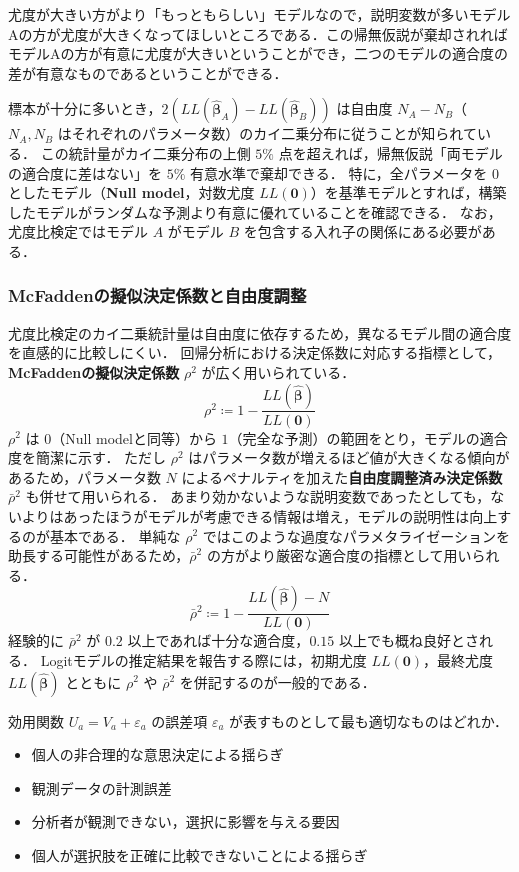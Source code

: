 尤度が大きい方がより「もっともらしい」モデルなので，説明変数が多いモデルAの方が尤度が大きくなってほしいところである．この帰無仮説が棄却されればモデルAの方が有意に尤度が大きいということができ，二つのモデルの適合度の差が有意なものであるということができる．

標本が十分に多いとき，$2(LL(\hat{\bm\beta}_A) - LL(\hat{\bm\beta}_B))$ は自由度 $N_A - N_B$（$N_A, N_B$ はそれぞれのパラメータ数）のカイ二乗分布に従うことが知られている．
この統計量がカイ二乗分布の上側 $5\%$ 点を超えれば，帰無仮説「両モデルの適合度に差はない」を $5\%$ 有意水準で棄却できる．
特に，全パラメータを $0$ としたモデル（\textbf{Null model}，対数尤度 $LL(\bm{0})$）を基準モデルとすれば，構築したモデルがランダムな予測より有意に優れていることを確認できる．
なお，尤度比検定ではモデル $A$ がモデル $B$ を包含する入れ子の関係にある必要がある．

\subsubsection{McFaddenの擬似決定係数と自由度調整}
尤度比検定のカイ二乗統計量は自由度に依存するため，異なるモデル間の適合度を直感的に比較しにくい．
回帰分析における決定係数に対応する指標として，\textbf{McFaddenの擬似決定係数} $\rho^2$ が広く用いられている．
\begin{equation}
    \rho^2 \coloneq 1-\frac{LL(\bm{\hat\beta})}{LL(\bm 0)}
\end{equation}
$\rho^2$ は $0$（Null modelと同等）から $1$（完全な予測）の範囲をとり，モデルの適合度を簡潔に示す．
ただし $\rho^2$ はパラメータ数が増えるほど値が大きくなる傾向があるため，パラメータ数 $N$ によるペナルティを加えた\textbf{自由度調整済み決定係数} $\bar\rho^2$ も併せて用いられる．
あまり効かないような説明変数であったとしても，ないよりはあったほうがモデルが考慮できる情報は増え，モデルの説明性は向上するのが基本である．
単純な $\rho^2$ ではこのような過度なパラメタライゼーションを助長する可能性があるため，$\bar\rho^2$ の方がより厳密な適合度の指標として用いられる．
\begin{equation}
    \bar\rho^2 \coloneq 1-\frac{LL(\bm{\hat\beta})-N}{LL(\bm 0)}
\end{equation}
経験的に $\bar\rho^2$ が $0.2$ 以上であれば十分な適合度，$0.15$ 以上でも概ね良好とされる．
Logitモデルの推定結果を報告する際には，初期尤度 $LL(\bm{0})$，最終尤度 $LL(\hat{\bm\beta})$ とともに $\rho^2$ や $\bar\rho^2$ を併記するのが一般的である．


\begin{example}[title={クイズ 1：誤差項の解釈}]
効用関数 $U_a = V_a + \varepsilon_a$ の誤差項 $\varepsilon_a$ が表すものとして最も適切なものはどれか．
\begin{itemize}
  \item[(ア)] 個人の非合理的な意思決定による揺らぎ
  \item[(イ)] 観測データの計測誤差
  \item[(ウ)] 分析者が観測できない，選択に影響を与える要因
  \item[(エ)] 個人が選択肢を正確に比較できないことによる揺らぎ
\end{itemize}
\end{example}

